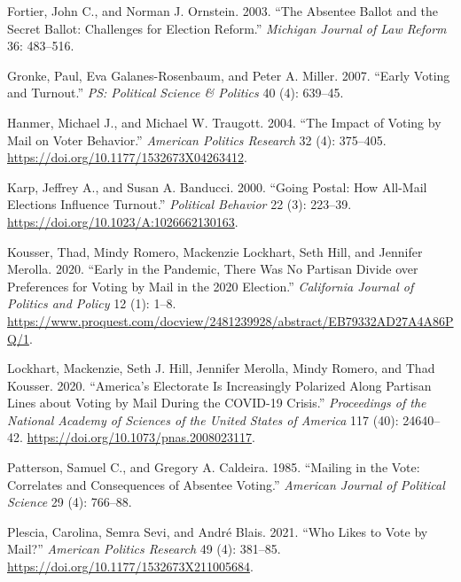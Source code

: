 \documentclass[12pt]{article}
\newlength{\cslhangindent}
\newlength{\cslentryspacingunit} %
\newenvironment{CSLReferences}[2] %
 {%
  \setlength{\parindent}{0pt}
  \ifodd #1
  \let\oldpar\par
  \def\par{\hangindent=\cslhangindent\oldpar}
  \fi
  \setlength{\parskip}{#2\cslentryspacingunit}
 }%
 {}
\begin{document}
\begin{CSLReferences}{1}{0}
\leavevmode{}%
Fortier, John C., and Norman J. Ornstein. 2003. {``The Absentee Ballot and the Secret Ballot: Challenges for Election Reform.''} \emph{Michigan Journal of Law Reform} 36: 483--516.

\leavevmode{}%
Gronke, Paul, Eva Galanes-Rosenbaum, and Peter A. Miller. 2007. {``Early Voting and Turnout.''} \emph{PS: Political Science \& Politics} 40 (4): 639--45.

\leavevmode{}%
Hanmer, Michael J., and Michael W. Traugott. 2004. {``The Impact of Voting by Mail on Voter Behavior.''} \emph{American Politics Research} 32 (4): 375--405. \url{https://doi.org/10.1177/1532673X04263412}.

\leavevmode{}%
Karp, Jeffrey A., and Susan A. Banducci. 2000. {``Going Postal: How All-Mail Elections Influence Turnout.''} \emph{Political Behavior} 22 (3): 223--39. \url{https://doi.org/10.1023/A:1026662130163}.

\leavevmode{}%
Kousser, Thad, Mindy Romero, Mackenzie Lockhart, Seth Hill, and Jennifer Merolla. 2020. {``Early in the Pandemic, There Was No Partisan Divide over Preferences for Voting by Mail in the 2020 Election.''} \emph{California Journal of Politics and Policy} 12 (1): 1--8. \url{https://www.proquest.com/docview/2481239928/abstract/EB79332AD27A4A86PQ/1}.

\leavevmode{}%
Lockhart, Mackenzie, Seth J. Hill, Jennifer Merolla, Mindy Romero, and Thad Kousser. 2020. {``America{'}s Electorate Is Increasingly Polarized Along Partisan Lines about Voting by Mail During the COVID-19 Crisis.''} \emph{Proceedings of the National Academy of Sciences of the United States of America} 117 (40): 24640--42. \url{https://doi.org/10.1073/pnas.2008023117}.

\leavevmode{}%
Patterson, Samuel C., and Gregory A. Caldeira. 1985. {``Mailing in the Vote: Correlates and Consequences of Absentee Voting.''} \emph{American Journal of Political Science} 29 (4): 766--88.

\leavevmode{}%
Plescia, Carolina, Semra Sevi, and André Blais. 2021. {``Who Likes to Vote by Mail?''} \emph{American Politics Research} 49 (4): 381--85. \url{https://doi.org/10.1177/1532673X211005684}.


\end{CSLReferences}
\end{document}
